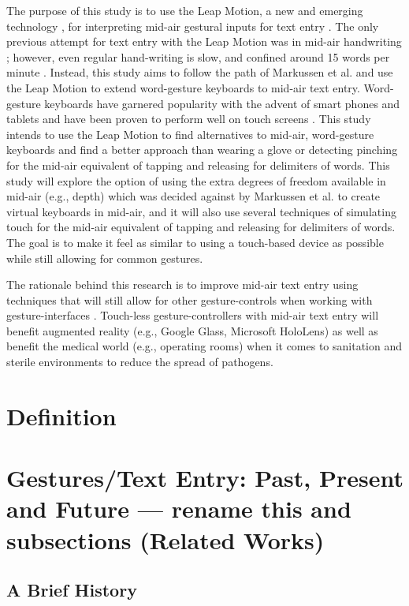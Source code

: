 The purpose of this study is to use the Leap Motion, a new and emerging technology \cite{ref15}, for interpreting mid-air gestural inputs for text entry \cite{ref16}. The only previous attempt for text entry with the Leap Motion was in mid-air handwriting \cite{ref17}; however, even regular hand-writing is slow, and confined around 15 words per minute \cite{ref3}. Instead, this study aims to follow the path of Markussen et al. \cite{ref9} and use the Leap Motion to extend word-gesture keyboards to mid-air text entry. Word-gesture keyboards have garnered popularity with the advent of smart phones and tablets and have been proven to perform well on touch screens \cite{ref6,ref19,ref20}. This study intends to use the Leap Motion to find alternatives to mid-air, word-gesture keyboards and find a better approach than wearing a glove or detecting pinching \cite{ref9,ref11} for the mid-air equivalent of tapping and releasing for delimiters of words. This study will explore the option of using the extra degrees of freedom available in mid-air (e.g., depth) which was decided against by Markussen et al. \cite{ref9} to create virtual keyboards in mid-air, and it will also use several techniques of simulating touch for the mid-air equivalent of tapping and releasing for delimiters of words. The goal is to make it feel as similar to using a touch-based device as possible while still allowing for common gestures.

The rationale behind this research is to improve mid-air text entry using techniques that will still allow for other gesture-controls when working with gesture-interfaces \cite{ref1,ref2,ref5,ref14,ref18}. Touch-less gesture-controllers with mid-air text entry will benefit augmented reality (e.g., Google Glass, Microsoft HoloLens) as well as benefit the medical world (e.g., operating rooms) when it comes to sanitation and sterile environments to reduce the spread of pathogens.

\section{Definition}

\section{Gestures/Text Entry: Past, Present and Future --- rename this and subsections (Related Works)}

\subsection{A Brief History}

